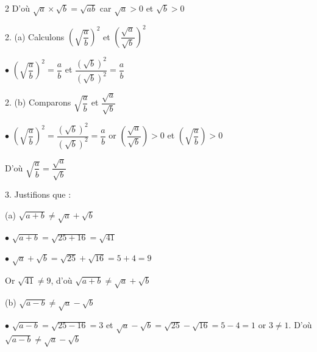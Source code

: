 \begin{multicols*}{2}
  	D'où $\sqrt{a} \times \sqrt{b} =\sqrt{ab}$ car $\sqrt{a}>0$ et $\sqrt{b}>0$
  	
  	2. (a) 	Calculons $\left(\sqrt{\dfrac{a}{b}} \right)^2$ et $\left(\dfrac{\sqrt{a}}{\sqrt{b}} \right)^2$
  	
  	$\bullet$ $\left(\sqrt{\dfrac{a}{b}} \right)^2= \dfrac{a}{b}$ et $\dfrac{\left(\sqrt{b}\right)^2}{\left(\sqrt{b}\right)^2}= \dfrac{a}{b}$
  	
  	2. (b) Comparons $\sqrt{\dfrac{a}{b}}$ et $\dfrac{\sqrt{a}}{\sqrt{b}}$
  	
  	$\bullet$ $\left(\sqrt{\dfrac{a}{b}} \right)^2=\dfrac{\left(\sqrt{b}\right)^2}{\left(\sqrt{b}\right)^2}= \dfrac{a}{b}$ or $\left(\dfrac{\sqrt{a}}{\sqrt{b}} \right)>0$ et $\left(\sqrt{\dfrac{a}{b}} \right)>0$
  	
  	D'où $\sqrt{\dfrac{a}{b}}=\dfrac{\sqrt{a}}{\sqrt{b}} $
  	
  	3. Justifions que : 
  	
  	(a) $\sqrt{a+b}\neq \sqrt{a}+\sqrt{b}$
  	
  	$\bullet$ $\sqrt{a+b}=\sqrt{25+16}=\sqrt{41}$
  	
  	$\bullet$ $\sqrt{a}+\sqrt{b}=\sqrt{25}+\sqrt{16}=5+4=9$
  	
  	Or $\sqrt{41}\neq9$, d'où $\sqrt{a+b}\neq \sqrt{a}+\sqrt{b}$
  	
  	(b) $\sqrt{a-b}\neq \sqrt{a}-\sqrt{b}$
  	
  	$\bullet$ $\sqrt{a-b}=\sqrt{25-16}=3$ et $\sqrt{a}-\sqrt{b}=\sqrt{25}-\sqrt{16}=5-4=1$ or $3\neq1$. D'où $\sqrt{a-b}\neq \sqrt{a}-\sqrt{b}$ 
  	
  	
  	

\end{multicols*}
